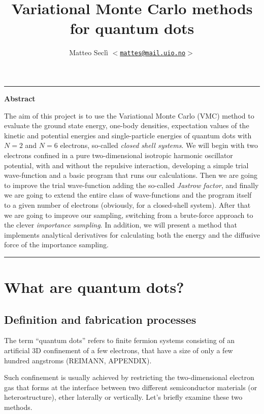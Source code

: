 \documentclass[a4paper,twoside,11pt]{book}
\author{
\normalsize Matteo Seclì \texttt{$<$\href{mailto:mattes@mail.uio.no}
{mattes@mail.uio.no}$>$}\\
}
\title{\textbf{Variational Monte Carlo methods for quantum dots}}
\begin{document}
\maketitle

\hrule
\begin{center}
	\large\textbf{Abstract}
	\medskip\\
	\begin{minipage}[c][][c]{0.8\textwidth}
		\small{
			The aim of this project is to use the Variational Monte Carlo (VMC) 
			method to evaluate the ground state energy, one-body densities, 
			expectation values of the kinetic and potential energies and 
			single-particle energies of quantum dots with $N = 2$ and $N = 6$ 
			electrons, so-called \emph{closed shell systems}. We will begin with 
			two electrons confined in a pure two-dimensional isotropic harmonic 
			oscillator potential, with and without the repulsive interaction, developing
			a simple trial wave-function and a basic program that runs our calculations.
			Then we are going to improve the trial wave-function adding the so-called 
			\emph{Jastrow factor}, and finally we are going to extend the entire class of
			wave-functions and the program itself to a given number of electrons 
			(obviously, for a closed-shell system). After that we are going to improve
			our sampling, switching from a brute-force approach to the clever
			\emph{importance sampling}. In addition, we will present a method that 
			implements analytical derivatives for calculating both the energy and the
			diffusive force of the importance sampling.			
		}
	\end{minipage}
\end{center}
\medskip
\hrule

\tableofcontents

\newpage

\chapter{What are quantum dots?}

\section{Definition and fabrication processes}
The term ``quantum dots'' refers to finite fermion systems consisting of an artificial 3D confinement of a few electrons, that have a size of only a few hundred angstroms (REIMANN, APPENDIX).

Such confinement is usually achieved by restricting the two-dimensional electron gas that forms at the interface between two different semiconductor materials (or heterostructure), ether laterally or vertically. Let's briefly examine these two methods.
\end{document}
